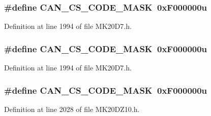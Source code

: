 \subsubsection[{\texorpdfstring{C\+A\+N\+\_\+\+C\+S\+\_\+\+C\+O\+D\+E\+\_\+\+M\+A\+SK}{CAN_CS_CODE_MASK}}]{\setlength{\rightskip}{0pt plus 5cm}\#define C\+A\+N\+\_\+\+C\+S\+\_\+\+C\+O\+D\+E\+\_\+\+M\+A\+SK~0x\+F000000u}\hypertarget{group___c_a_n___register___masks_gadff04787b30174d22d7955037c850b7c}{}\label{group___c_a_n___register___masks_gadff04787b30174d22d7955037c850b7c}


Definition at line 1994 of file M\+K20\+D7.\+h.

\subsubsection[{\texorpdfstring{C\+A\+N\+\_\+\+C\+S\+\_\+\+C\+O\+D\+E\+\_\+\+M\+A\+SK}{CAN_CS_CODE_MASK}}]{\setlength{\rightskip}{0pt plus 5cm}\#define C\+A\+N\+\_\+\+C\+S\+\_\+\+C\+O\+D\+E\+\_\+\+M\+A\+SK~0x\+F000000u}\hypertarget{group___c_a_n___register___masks_gadff04787b30174d22d7955037c850b7c}{}\label{group___c_a_n___register___masks_gadff04787b30174d22d7955037c850b7c}


Definition at line 1994 of file M\+K20\+D7.\+h.

\subsubsection[{\texorpdfstring{C\+A\+N\+\_\+\+C\+S\+\_\+\+C\+O\+D\+E\+\_\+\+M\+A\+SK}{CAN_CS_CODE_MASK}}]{\setlength{\rightskip}{0pt plus 5cm}\#define C\+A\+N\+\_\+\+C\+S\+\_\+\+C\+O\+D\+E\+\_\+\+M\+A\+SK~0x\+F000000u}\hypertarget{group___c_a_n___register___masks_gadff04787b30174d22d7955037c850b7c}{}\label{group___c_a_n___register___masks_gadff04787b30174d22d7955037c850b7c}


Definition at line 2028 of file M\+K20\+D\+Z10.\+h.

